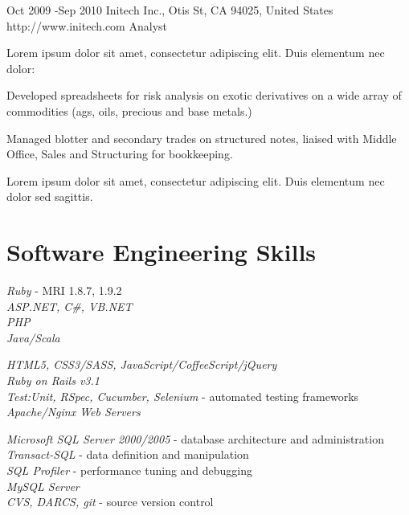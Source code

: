 \documentclass[10pt]{article} %
\begin{document}
\job
{Oct 2009 -}{Sep 2010}
{Initech Inc., Otis St, CA 94025, United States}
{http://www.initech.com}
{Analyst}
{Lorem ipsum dolor sit amet, consectetur adipiscing elit. Duis elementum nec dolor:

    \begin{itemize-noindent}
    \item{Developed spreadsheets for risk analysis on exotic derivatives on a wide array of commodities (ags, oils, precious and base metals.)}
    \item{Managed blotter and secondary trades on structured notes, liaised with Middle Office, Sales and Structuring for bookkeeping.}
    \end{itemize-noindent}

    Lorem ipsum dolor sit amet, consectetur adipiscing elit. Duis elementum nec dolor sed sagittis.}


\section{Software Engineering Skills}

{
    \textit{Ruby} - MRI 1.8.7, 1.9.2\\
    \textit{ASP.NET, C\#, VB.NET}\\
    \textit{PHP}\\
    \textit{Java/Scala}
}


{
    \textit{HTML5, CSS3/SASS, JavaScript/CoffeeScript/jQuery}\\
    \textit{Ruby on Rails v3.1}\\
    \textit{Test:Unit, RSpec, Cucumber, Selenium} - automated testing frameworks\\
    \textit{Apache/Nginx Web Servers}\\
}


{
    \textit{Microsoft SQL Server 2000/2005} - database architecture and administration\\
    \textit{Transact-SQL} - data definition and manipulation\\
    \textit{SQL Profiler} - performance tuning and debugging\\
    \textit{MySQL Server}\\
    \textit{CVS, DARCS, git} - source version control
}
\end{document}
